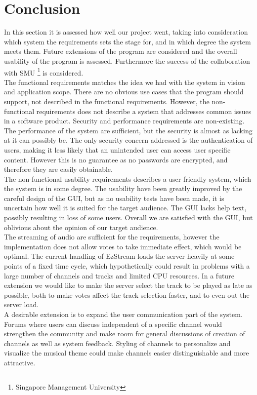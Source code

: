 \documentclass[a4paper,11pt,report]{article}
\begin{document}
\section{Conclusion}
In this section it is assessed how well our project went, taking into consideration which system the requirements sets the stage for, and in which degree the system meets them. Future extensions of the program are considered and the overall usability of the program is assessed. Furthermore the success of the collaboration with SMU \footnote{Singapore Management University} is considered. \\
The functional requirements matches the idea we had with the system in vision and application scope. There are no obvious use cases that the program should support, not described in the functional requirements. However, the non-functional requirements does not describe a system that addresses common issues in a software product. Security and performance requirements are non-existing. The performance of the system are sufficient, but the security is almost as lacking at it can possibly be. The only security concern addressed is the authentication of users, making it less likely that an unintended user can access user specific content. However this is no guarantee as no passwords are encrypted, and therefore they are easily obtainable. \\
The non-functional usability requirements describes a user friendly system, which the system is in some degree. The usability have been greatly improved by the careful design of the GUI, but as no usability tests have been made, it is uncertain how well it is suited for the target audience. The GUI lacks help text, possibly resulting in loss of some users. Overall we are satisfied with the GUI, but oblivious about the opinion of our target audience. \\
The streaming of audio are sufficient for the requirements, however the implementation does not allow votes to take immediate effect, which would be optimal. The current handling of EzStream loads the server heavily at some points of a fixed time cycle, which hypothetically could result in problems with a large number of channels and tracks and limited CPU resources. In a future extension we would like to make the server select the track to be played as late as possible, both to make votes affect the track selection faster, and to even out the server load. \\
A desirable extension is to expand the user communication part of the system. Forums where users can discuss independent of a specific channel would strengthen the community and make room for general discussions of creation of channels as well as system feedback. Styling of channels to personalize and visualize the musical theme could make channels easier distinguishable and more attractive. \\
\end{document}
